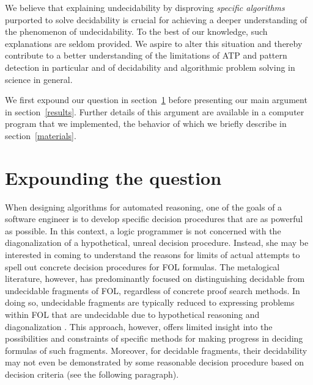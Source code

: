 \documentclass[%
  manuscript=article,   %
  year=2024,
  volume=77,
  doi=10.59203/zfn.77.694,
]{zfn}
\begin{document}
We believe that explaining undecidability by disproving \emph{specific algorithms} purported to solve decidability is crucial for achieving a deeper understanding of the phenomenon of undecidability. To the best of our knowledge, such explanations are seldom provided. We aspire to alter this situation and thereby contribute to a better understanding of the limitations of ATP and pattern detection in particular and of decidability and algorithmic problem solving in science in general.

We first expound our question in section~\ref{question} before presenting our main argument in section~\ref{results}. Further details of this argument 
are available in a computer program that we implemented, the behavior of which we briefly describe in section~\ref{materials}.

\section{Expounding the question}\label{question}

When designing algorithms for automated reasoning, one of the goals of a software engineer is to develop specific decision procedures that are as powerful as possible. In this context, a logic programmer is not concerned with the diagonalization of a hypothetical, unreal decision procedure. 
Instead, she may be interested in coming to understand the reasons for limits of actual attempts to spell out concrete decision procedures for FOL formulas. 
The metalogical literature, however, has predominantly focused on distinguishing decidable from undecidable fragments of FOL, regardless of concrete proof search methods. In doing so, undecidable fragments are typically reduced to expressing problems within FOL that are undecidable due to hypothetical reasoning and diagonalization \parencite[cf.][]{Boerger_et_al}. This approach, however, offers limited insight into the possibilities and constraints of specific methods for making progress in deciding formulas of such fragments. Moreover, for decidable fragments, their decidability may not even be demonstrated by some reasonable decision procedure based on decision criteria (see the following paragraph).
\end{document}
